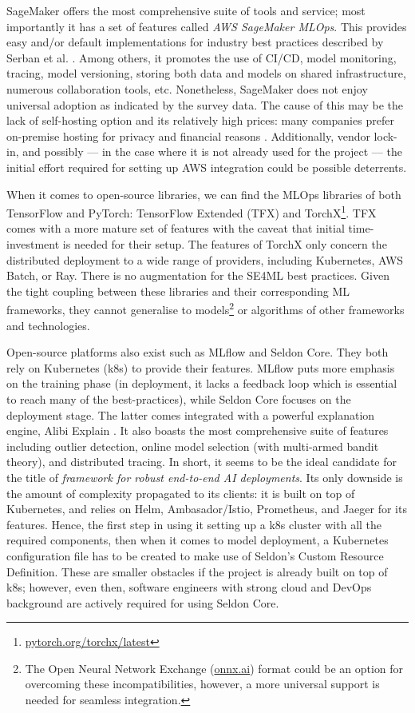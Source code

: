 SageMaker offers the most comprehensive suite of tools and service; most importantly it has a set of features called \textit{AWS SageMaker MLOps}. This provides easy and/or default implementations for industry best practices described by Serban et al. \cite{serban2020adoption,serban2021practices}. Among others, it promotes the use of CI/CD, model monitoring, tracing, model versioning, storing both data and models on shared infrastructure, numerous collaboration tools, etc. Nonetheless, SageMaker does not enjoy universal adoption as indicated by the survey data. The cause of this may be the lack of self-hosting option and its relatively high prices: many companies prefer on-premise hosting for privacy and financial reasons \cite{bosch2021engineering}. Additionally, vendor lock-in, and possibly --- in the case where it is not already used for the project --- the initial effort required for setting up AWS integration could be possible deterrents.

When it comes to open-source libraries, we can find the MLOps libraries of both TensorFlow and PyTorch: TensorFlow Extended (TFX) \cite{baylor2017tfx} and TorchX\footnote{\href{https://pytorch.org/torchx/latest/}{pytorch.org/torchx/latest}}. TFX comes with a more mature set of features with the caveat that initial time-investment is needed for their setup. The features of TorchX only concern the distributed deployment to a wide range of providers, including Kubernetes, AWS Batch, or Ray. There is no augmentation for the SE4ML best practices. Given the tight coupling between these libraries and their corresponding ML frameworks, they cannot generalise to models\footnote{The Open Neural Network Exchange (\href{https://onnx.ai/}{onnx.ai}) format could be an option for overcoming these incompatibilities, however, a more universal support is needed for seamless integration.} or algorithms of other frameworks and technologies. 

Open-source platforms also exist such as MLflow and Seldon Core. They both rely on Kubernetes (k8s) to provide their features. MLflow puts more emphasis on the training phase (in deployment, it lacks a feedback loop which is essential to reach many of the best-practices), while Seldon Core focuses on the deployment stage. The latter comes integrated with a powerful explanation engine, Alibi Explain \cite{klaise2021alibi}. It also boasts the most comprehensive suite of features including outlier detection, online model selection (with multi-armed bandit theory), and distributed tracing. In short, it seems to be the ideal candidate for the title of \textit{framework for robust end-to-end AI deployments}. Its only downside is the amount of complexity propagated to its clients: it is built on top of Kubernetes, and relies on Helm, Ambasador/Istio, Prometheus, and Jaeger for its features. Hence, the first step in using it setting up a k8s cluster with all the required components, then when it comes to model deployment, a Kubernetes configuration file has to be created to make use of Seldon's Custom Resource Definition. These are smaller obstacles if the project is already built on top of k8s; however, even then, software engineers with strong cloud and DevOps background are actively required for using Seldon Core.

